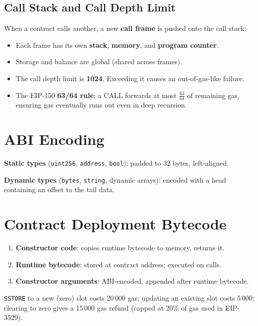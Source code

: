 \documentclass[12pt,a4paper,openany]{book}
\theoremstyle{definition}
\theoremstyle{plain}
\theoremstyle{remark}
\begin{document}
\subsection{Call Stack and Call Depth Limit}

When a contract calls another, a new \textbf{call frame} is pushed onto
the call stack:
\begin{itemize}
  \item Each frame has its own \textbf{stack}, \textbf{memory}, and
        \textbf{program counter}.
  \item Storage and balance are global (shared across frames).
  \item The call depth limit is \textbf{1024}.  Exceeding it causes an
        out-of-gas-like failure.
  \item The EIP-150 \textbf{63/64 rule}: a CALL forwards at most
        $\frac{63}{64}$ of remaining gas, ensuring gas eventually runs
        out even in deep recursion.
\end{itemize}

\section{ABI Encoding}

\textbf{Static types} (\texttt{uint256}, \texttt{address}, \texttt{bool}):
padded to 32 bytes, left-aligned.

\textbf{Dynamic types} (\texttt{bytes}, \texttt{string}, dynamic arrays):
encoded with a head containing an offset to the tail data.

\section{Contract Deployment Bytecode}

\begin{enumerate}
  \item \textbf{Constructor code}: copies runtime bytecode to memory, returns it.
  \item \textbf{Runtime bytecode}: stored at contract address; executed on calls.
  \item \textbf{Constructor arguments}: ABI-encoded, appended after runtime bytecode.
\end{enumerate}

\begin{exambox}
  \texttt{SSTORE} to a new (zero) slot costs 20\,000 gas; updating an
  existing slot costs 5\,000; clearing to zero gives a 15\,000 gas
  refund (capped at 20\% of gas used in EIP-3529).
\end{exambox}
\end{document}
